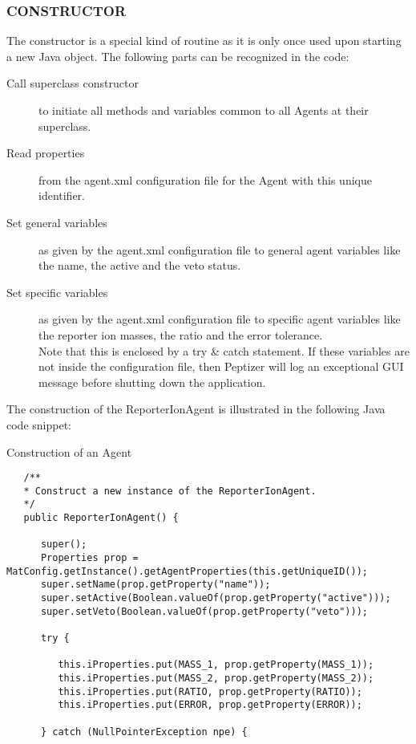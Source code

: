 {\subsubsection{CONSTRUCTOR}
\npar The constructor is a special kind of routine as it is only once used upon starting a new Java object. The following parts can be recognized in the code:
\begin{description}
\item[Call superclass constructor] to initiate all methods and variables common to all Agents at their superclass.
\item[Read properties] from the agent.xml configuration file for the Agent with this unique identifier. 
\item[Set general variables] as given by the agent.xml configuration file to general agent variables like the name, the active and the veto status.
\item[Set specific variables] as given by the agent.xml configuration file to specific agent variables like the reporter ion masses, the ratio and the error tolerance.\\Note that this is enclosed by a try \& catch statement. If these variables are not inside the configuration file, then Peptizer will log an exceptional GUI message before shutting down the application.
\end{description}
\npar The construction of the ReporterIonAgent is illustrated in the following Java code snippet:
%
\begin{algorithm}[H]
\caption{Construction of an Agent}
\scriptsize
\vspace{0.3cm}
\begin{verbatim}
   /**
   * Construct a new instance of the ReporterIonAgent.
   */
   public ReporterIonAgent() {

      super();
      Properties prop = MatConfig.getInstance().getAgentProperties(this.getUniqueID());
      super.setName(prop.getProperty("name"));
      super.setActive(Boolean.valueOf(prop.getProperty("active")));
      super.setVeto(Boolean.valueOf(prop.getProperty("veto")));

      try {

         this.iProperties.put(MASS_1, prop.getProperty(MASS_1));
         this.iProperties.put(MASS_2, prop.getProperty(MASS_2));
         this.iProperties.put(RATIO, prop.getProperty(RATIO));
         this.iProperties.put(ERROR, prop.getProperty(ERROR));

      } catch (NullPointerException npe) {


\end{verbatim}
\end{algorithm}}
